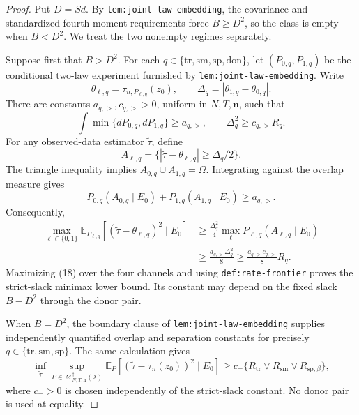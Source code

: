 \documentclass{article}
\begin{document}
\begin{proof}
Put \(D=Sd\).  By \texttt{lem:joint-law-embedding}, the covariance and standardized fourth-moment requirements force \(B\geq D^2\), so the class is empty when \(B<D^2\).  We treat the two nonempty regimes separately.

Suppose first that \(B>D^2\).  For each
\(q\in\{\mathrm{tr},\mathrm{sm},\mathrm{sp},\mathrm{don}\}\), let
\((P_{0,q},P_{1,q})\) be the conditional two-law experiment furnished by \texttt{lem:joint-law-embedding}.  Write
\[
\theta_{\ell,q}=\tau_{n,P_{\ell,q}}(z_0),
\qquad
\Delta_q=|\theta_{1,q}-\theta_{0,q}|.
\]
There are constants \(a_{q,>},c_{q,>}>0\), uniform in \(N,T,\mathbf n\), such that
\[
\int\min\{dP_{0,q},dP_{1,q}\}\geq a_{q,>},
\qquad
\Delta_q^2\geq c_{q,>}R_q.
\tag{16}
\]
For any observed-data estimator \(\widetilde\tau\), define
\[
A_{\ell,q}=\{|\widetilde\tau-\theta_{\ell,q}|\geq\Delta_q/2\}.
\]
The triangle inequality implies \(A_{0,q}\cup A_{1,q}=\Omega\).  Integrating against the overlap measure gives
\[
P_{0,q}(A_{0,q}\mid E_0)+P_{1,q}(A_{1,q}\mid E_0)
\geq a_{q,>}.
\tag{17}
\]
Consequently,
\[
\begin{aligned}
\max_{\ell\in\{0,1\}}
\mathbb E_{P_{\ell,q}}[(\widetilde\tau-\theta_{\ell,q})^2\mid E_0]
&\geq\frac{\Delta_q^2}{4}
\max_\ell P_{\ell,q}(A_{\ell,q}\mid E_0)\\
&\geq\frac{a_{q,>}\Delta_q^2}{8}
\geq\frac{a_{q,>}c_{q,>}}8R_q.
\end{aligned}
\tag{18}
\]
Maximizing (18) over the four channels and using \texttt{def:rate-frontier} proves the strict-slack minimax lower bound.  Its constant may depend on the fixed slack \(B-D^2\) through the donor pair.

When \(B=D^2\), the boundary clause of \texttt{lem:joint-law-embedding} supplies independently quantified overlap and separation constants for precisely
\(q\in\{\mathrm{tr},\mathrm{sm},\mathrm{sp}\}\).  The same calculation gives
\[
\inf_{\widetilde\tau}\sup_{P\in\mathcal M_{N,T,\mathbf n}^{\dagger}(\lambda)}
\mathbb E_P[(\widetilde\tau-\tau_n(z_0))^2\mid E_0]
\geq c_{=}
\{R_{\mathrm{tr}}\vee R_{\mathrm{sm}}\vee R_{\mathrm{sp},\beta}\},
\tag{19}
\]
where \(c_{=}>0\) is chosen independently of the strict-slack constant.  No donor pair is used at equality.


\end{proof}
\end{document}
